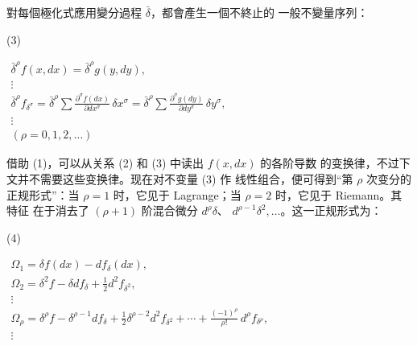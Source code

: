 \documentclass[11pt]{article}
\providecommand{\bdelta}{\bar{\delta}}
\providecommand{\srcnumdisplay}[3][3.4em]{%
  \par\smallskip\noindent
  \begin{minipage}[t]{#1}\vspace*{0pt}#2\end{minipage}%
  \begin{minipage}[t]{\dimexpr\linewidth-#1\relax}\vspace*{0pt}\centering
  \(\displaystyle #3\)
  \end{minipage}\par\smallskip}
\begin{document}
對每個極化式應用變分過程 \(\bdelta\)，都會產生一個不終止的
一般不變量序列：
\srcnumdisplay{(3)}{%
\begin{gathered}
\bdelta^\rho f(x,dx)=\bdelta^\rho g(y,dy),\\
\vdots\\
\bdelta^\rho f_{\delta^\sigma}
=\bdelta^\rho\sum\frac{\partial^\sigma f(dx)}{\partial dx^\sigma}\,
\delta x^\sigma
=\bdelta^\rho\sum\frac{\partial^\sigma g(dy)}{\partial dy^\sigma}\,
\delta y^\sigma,\\
\vdots\\[0.2em]
(\rho=0,1,2,\ldots)
\end{gathered}
}
借助 (1)，可以从关系 (2) 和 (3) 中读出 \(f(x,dx)\) 的各阶导数
的变换律，不过下文并不需要这些变换律。现在对不变量 (3) 作
线性组合，便可得到“第 \(\rho\) 次变分的正规形式”：当 \(\rho=1\)
时，它见于 Lagrange；当 \(\rho=2\) 时，它见于 Riemann。其特征
在于消去了 \((\rho+1)\) 阶混合微分 \(d^\rho\delta\)、
\(d^{\rho-1}\delta^2,\ldots\)。这一正规形式为：
\srcnumdisplay{(4)}{%
\begin{gathered}
\Omega_1=\delta f(dx)-d f_\delta(dx),\\
\Omega_2=\delta^2 f-\delta d f_\delta+\frac12 d^2 f_{\delta^2},\\
\vdots\\
\Omega_\rho=\delta^\rho f-\delta^{\rho-1}d f_\delta
+\frac12\delta^{\rho-2}d^2 f_{\delta^2}
+\cdots+\frac{(-1)^\rho}{\rho!}\,d^\rho f_{\delta^\rho},\\
\vdots
\end{gathered}
}
\end{document}
